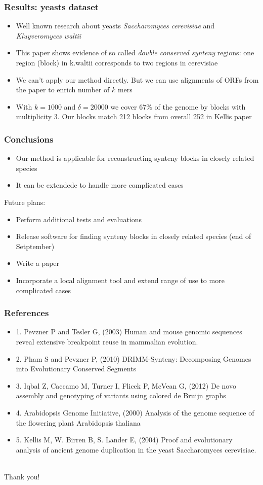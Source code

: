 \documentclass[svgnames,14pt]{beamer}
\begin{document}
\begin{frame}
\frametitle{Results: yeasts dataset}
\begin{itemize}
\item Well known research about yeasts \textit{Saccharomyces cerevisiae} and \textit{Kluyveromyces waltii}  
\item This paper shows evidence of so called \textit{double conserved synteny} regions: one region (block) in k.waltii corresponds to two
regions in cerevisiae
\item We can't apply our method directly. But we can use alignments of ORFs from 
the paper to enrich number of \(k\) mers
\item With \(k = 1000\) and \(\delta = 20 000 \) we cover 67\% of the genome by blocks with multiplicity 3. Our blocks match 212 blocks
from overall 252 in Kellis paper
\end{itemize}
\end{frame}

\begin{frame}
\frametitle{Conclusions}
\begin{itemize}
\item Our method is applicable for reconstructing synteny blocks in closely related species
\item It can be extendede to handle more complicated cases
\end{itemize}
Future plans:
\begin{itemize}
\item Perform additional tests and evaluations
\item Release software for finding synteny blocks in closely related species (end of Setptember)
\item Write a paper
\item Incorporate a local alignment tool and extend range of use to more complicated cases
\end{itemize}
\end{frame}

\begin{frame}
\frametitle{References}
\begin{itemize}
\item 1. Pevzner P and Tesler G, (2003) Human and mouse genomic sequences reveal extensive breakpoint reuse in mammalian evolution. 
\item 2. Pham S and Pevzner P, (2010) DRIMM-Synteny: Decomposing Genomes into Evolutionary Conserved Segments
\item 3. Iqbal Z, Caccamo M, Turner I, Flicek P, McVean G, (2012) De novo assembly and genotyping of variants using colored de Bruijn graphs
\item 4. Arabidopsis Genome Initiative, (2000) Analysis of the genome sequence of the flowering plant Arabidopsis thaliana
\item 5. Kellis M, W. Birren B, S. Lander E, (2004) Proof and evolutionary analysis of ancient genome duplication in the yeast Saccharomyces cerevisiae.
\end{itemize}
\end{frame}

\begin{center}
\hfill \huge \\
\vspace{60pt}
Thank you!
\end{center}
\end{document}
